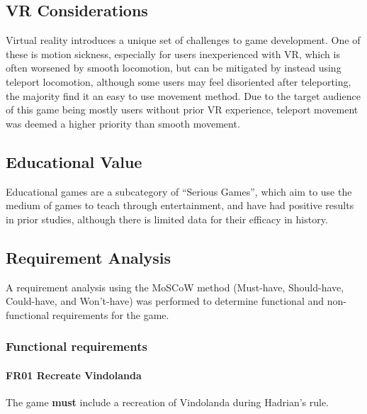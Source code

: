 \documentclass[sigconf,authordraft]{acmart}
\begin{document}

\subsection{VR Considerations}
Virtual reality introduces a unique set of challenges to game development. One
of these is motion sickness, especially for users inexperienced with VR,
\cite{chattha_motion_2020} which is often worsened by smooth locomotion, but can
be mitigated by instead using teleport locomotion, although some users may feel
disoriented after teleporting, the majority find it an easy to use movement
method. \cite{bozgeyikli_point_2016} Due to the target audience of this game
being mostly users without prior VR experience, teleport movement was deemed a
higher priority than smooth movement.


\subsection{Educational Value}
Educational games are a subcategory of ``Serious Games'', which aim to use the
medium of games to teach through entertainment, and have had positive results in
prior studies, although there is limited data for their efficacy in history.
\cite{backlund_educational_2013}


\subsection{Requirement Analysis}

A requirement analysis using the MoSCoW method (Must-have, Should-have,
Could-have, and Won't-have) was performed to determine functional and
non-functional requirements for the game.

\subsubsection{Functional requirements}

\paragraph{FR01 Recreate Vindolanda}
The game \textbf{must} include a recreation of Vindolanda during Hadrian's
rule.
\end{document}
